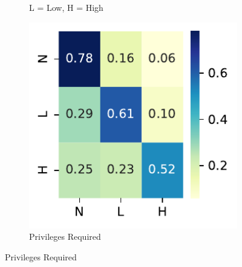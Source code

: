 \documentclass[12pt]{article}
\begin{document}
\begin{figure}
\begin{subfigure}[t]{0.45\textwidth}
		\begin{tablenotes}
			\footnotesize
			\item \quad L = Low, H = High
		\end{tablenotes}
	\end{subfigure}

	\vspace{1em}

	\begin{subfigure}[t]{0.45\textwidth}
		\includegraphics[width=\textwidth]{./figures/confusion_matrices/privileges_required_nvd.pdf}
		\caption{Privileges Required}


\end{subfigure}
\end{figure}
\end{document}
